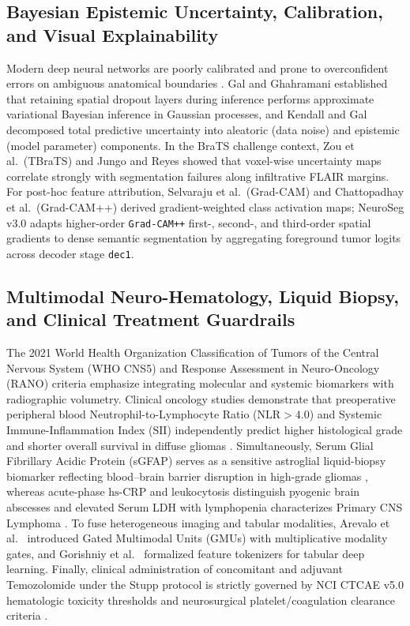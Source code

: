 \documentclass[conference]{IEEEtran}
\begin{document}
\subsection{Bayesian Epistemic Uncertainty, Calibration, and Visual Explainability}
Modern deep neural networks are poorly calibrated and prone to overconfident errors on ambiguous anatomical boundaries \cite{guo2017calibration}. Gal and Ghahramani \cite{gal2016dropout} established that retaining spatial dropout layers during inference performs approximate variational Bayesian inference in Gaussian processes, and Kendall and Gal \cite{kendall2017uncertainties} decomposed total predictive uncertainty into aleatoric (data noise) and epistemic (model parameter) components. In the BraTS challenge context, Zou et al.\ (TBraTS) \cite{zou2022tbrats} and Jungo and Reyes \cite{jungo2019uncertainty} showed that voxel-wise uncertainty maps correlate strongly with segmentation failures along infiltrative FLAIR margins. For post-hoc feature attribution, Selvaraju et al.\ (Grad-CAM) \cite{selvaraju2017gradcam} and Chattopadhay et al.\ (Grad-CAM++) \cite{chattopadhay2018gradcampp} derived gradient-weighted class activation maps; NeuroSeg v3.0 adapts higher-order \texttt{Grad-CAM++} first-, second-, and third-order spatial gradients to dense semantic segmentation by aggregating foreground tumor logits across decoder stage \texttt{dec1}.

\subsection{Multimodal Neuro-Hematology, Liquid Biopsy, and Clinical Treatment Guardrails}
The 2021 World Health Organization Classification of Tumors of the Central Nervous System (WHO CNS5) \cite{louis2021who} and Response Assessment in Neuro-Oncology (RANO) criteria \cite{wen2010rano, eisenhauer2009recist} emphasize integrating molecular and systemic biomarkers with radiographic volumetry. Clinical oncology studies demonstrate that preoperative peripheral blood Neutrophil-to-Lymphocyte Ratio ($\text{NLR} > 4.0$) and Systemic Immune-Inflammation Index ($\text{SII}$) independently predict higher histological grade and shorter overall survival in diffuse gliomas \cite{bambury2013nlr, abdelrazeq2021sii}. Simultaneously, Serum Glial Fibrillary Acidic Protein (sGFAP) serves as a sensitive astroglial liquid-biopsy biomarker reflecting blood--brain barrier disruption in high-grade gliomas \cite{perez2021gfap}, whereas acute-phase $\text{hs-CRP}$ and leukocytosis distinguish pyogenic brain abscesses \cite{brouwer2014abscess} and elevated Serum LDH with lymphopenia characterizes Primary CNS Lymphoma \cite{grommes2017pcnsl}. To fuse heterogeneous imaging and tabular modalities, Arevalo et al.\ \cite{arevalo2017gmu} introduced Gated Multimodal Units (GMUs) with multiplicative modality gates, and Gorishniy et al.\ \cite{gorishniy2021fttransformer} formalized feature tokenizers for tabular deep learning. Finally, clinical administration of concomitant and adjuvant Temozolomide under the Stupp protocol \cite{stupp2005radiotherapy} is strictly governed by NCI CTCAE v5.0 hematologic toxicity thresholds \cite{ctcae2017v5} and neurosurgical platelet/coagulation clearance criteria \cite{lichaos2015platelet}.
\end{document}
